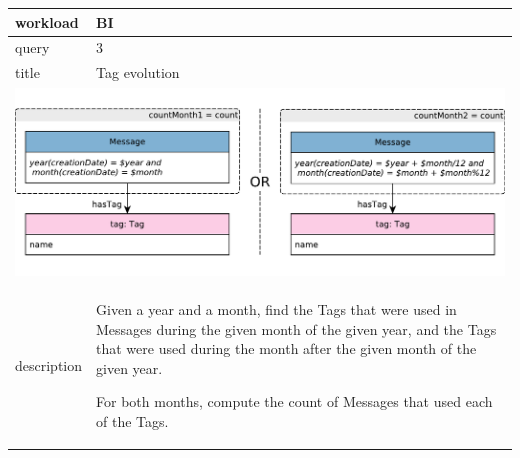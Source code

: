 \renewcommand*{\arraystretch}{1.1}

\noindent\begin{tabularx}{17cm}{|p{1.95cm}|X|}
	\hline
	workload    & BI \\ \hline
%
	query       & 3 \\ \hline
%
	title       & Tag evolution \\ \hline
	\multicolumn{2}{|c|}{ \includegraphics[scale=\patternscale,margin=0cm .2cm]{patterns/bi03}} \\ \hline
	description & Given a year and a month, find the Tags that were used in Messages
during the given month of the given year, and the Tags that were used
during the month after the given month of the given year.

For both months, compute the count of Messages that used each of the
Tags.
 \\ \hline
	

\end{tabularx}

